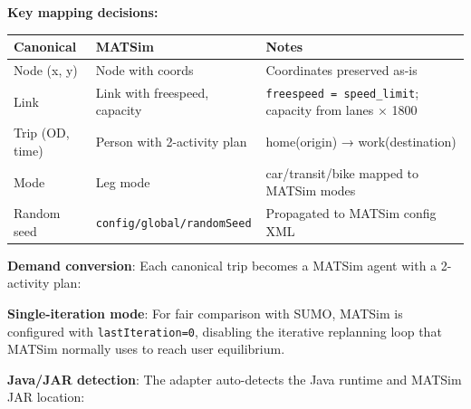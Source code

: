 \textbf{Key mapping decisions:}

\begin{longtable}[]{@{}lll@{}}
\toprule\noalign{}
Canonical & MATSim & Notes \\
\midrule\noalign{}
\endhead
\bottomrule\noalign{}
\endlastfoot
Node (x, y) & Node with coords & Coordinates preserved as-is \\
Link & Link with freespeed, capacity &
\texttt{freespeed\ =\ speed\_limit}; capacity from lanes × 1800 \\
Trip (OD, time) & Person with 2-activity plan & home(origin) →
work(destination) \\
Mode & Leg mode & car/transit/bike mapped to MATSim modes \\
Random seed & \texttt{config/global/randomSeed} & Propagated to MATSim
config XML \\
\end{longtable}

\textbf{Demand conversion}: Each canonical trip becomes a MATSim agent
with a 2-activity plan:

\begin{Shaded}
\begin{Highlighting}[]
\NormalTok{\textless{}}\NormalTok{\textgreater{}}
\NormalTok{  \textless{}}\NormalTok{\textgreater{}}
\NormalTok{    \textless{}}\NormalTok{/\textgreater{}}
\NormalTok{    \textless{}}\NormalTok{/\textgreater{}}
\NormalTok{    \textless{}}\NormalTok{/\textgreater{}}
\NormalTok{  \textless{}/}\NormalTok{\textgreater{}}
\NormalTok{\textless{}/}\NormalTok{\textgreater{}}
\end{Highlighting}
\end{Shaded}

\textbf{Single-iteration mode}: For fair comparison with SUMO, MATSim is
configured with \texttt{lastIteration=0}, disabling the iterative
replanning loop that MATSim normally uses to reach user equilibrium.

\textbf{Java/JAR detection}: The adapter auto-detects the Java runtime
and MATSim JAR location:


